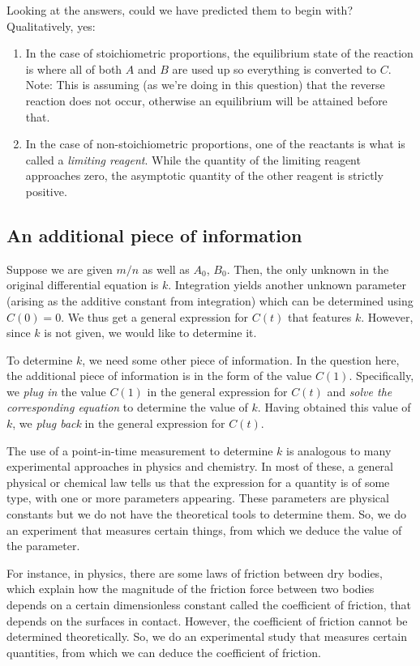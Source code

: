 \documentclass{amsart}
\begin{document}
Looking at the answers, could we have predicted them to begin with?
Qualitatively, yes:

\begin{enumerate}
\item In the case of stoichiometric proportions, the equilibrium state
  of the reaction is where all of both $A$ and $B$ are used up so
  everything is converted to $C$. Note: This is assuming (as we're
  doing in this question) that the reverse reaction does not occur,
  otherwise an equilibrium will be attained before that.
\item In the case of non-stoichiometric proportions, one of the
  reactants is what is called a {\em limiting reagent}. While the
  quantity of the limiting reagent approaches zero, the asymptotic
  quantity of the other reagent is strictly positive.
\end{enumerate}

\subsection{An additional piece of information}

Suppose we are given $m/n$ as well as $A_0$, $B_0$. Then, the only
unknown in the original differential equation is $k$. Integration
yields another unknown parameter (arising as the additive constant
from integration) which can be determined using $C(0) = 0$. We thus
get a general expression for $C(t)$ that features $k$. However, since
$k$ is not given, we would like to determine it.

To determine $k$, we need some other piece of information. In the
question here, the additional piece of information is in the form of
the value $C(1)$. Specifically, we {\em plug in} the value $C(1)$ in
the general expression for $C(t)$ and {\em solve the corresponding
equation} to determine the value of $k$. Having obtained this value of
$k$, we {\em plug back} in the general expression for $C(t)$.

The use of a point-in-time measurement to determine $k$ is analogous
to many experimental approaches in physics and chemistry. In most of
these, a general physical or chemical law tells us that the expression
for a quantity is of some type, with one or more parameters
appearing. These parameters are physical constants but we do not have
the theoretical tools to determine them. So, we do an experiment that
measures certain things, from which we deduce the value of the parameter.

For instance, in physics, there are some laws of friction between dry
bodies, which explain how the magnitude of the friction force between
two bodies depends on a certain dimensionless constant called the
coefficient of friction, that depends on the surfaces in
contact. However, the coefficient of friction cannot be determined
theoretically. So, we do an experimental study that measures certain
quantities, from which we can deduce the coefficient of friction.
\end{document}
